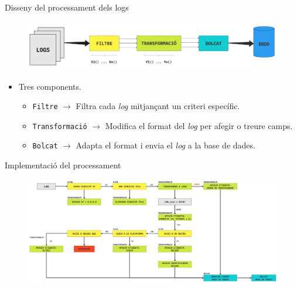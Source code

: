 \begin{frame}{Disseny del processament dels logs}

    \begin{figure}
        \includegraphics[width=\textwidth]{figures/log-processing}\label{fig:log-processing}
    \end{figure}

    \begin{itemize}%
        \item Tres components.
        \begin{itemize}%
            \item \texttt{Filtre} \(\rightarrow\) Filtra cada \textit{log} mitjançant un criteri específic.
            \item \texttt{Transformació} \(\rightarrow\) Modifica el format del \textit{log} per afegir o treure camps.
            \item \texttt{Bolcat} \(\rightarrow\) Adapta el format i envia el \textit{log} a la base de dades.
        \end{itemize}
    \end{itemize}
\end{frame}


\begin{frame}{Implementació del processament}
    \begin{figure}
        \includegraphics[width=1\textwidth]{figures/log-processing-workflow}\label{fig:log-processing-workflow}
    \end{figure}
\end{frame}


